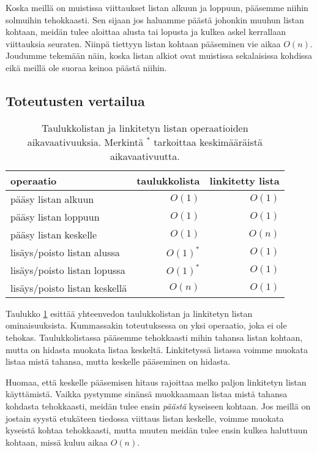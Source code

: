 Koska meillä on muistissa viittaukset listan alkuun ja loppuun,
pääsemme niihin solmuihin tehokkaasti.
Sen sijaan jos haluamme päästä johonkin muuhun listan kohtaan,
meidän tulee aloittaa alusta tai lopusta ja kulkea askel
kerrallaan viittauksia seuraten.
Niinpä tiettyyn listan kohtaan pääseminen vie aikaa $O(n)$.
Joudumme tekemään näin, koska listan alkiot ovat muistissa
sekalaisissa kohdissa eikä meillä ole suoraa keinoa päästä niihin.

\subsection{Toteutusten vertailua}

\begin{table}
\center
\begin{tabular}{lrr}
operaatio & taulukkolista & linkitetty lista \\
\hline
pääsy listan alkuun & $O(1)$ & $O(1)$ \\
pääsy listan loppuun & $O(1)$ & $O(1)$ \\ 
pääsy listan keskelle &  $O(1)$ & $O(n)$ \\
lisäys/poisto listan alussa & $O(1)^*$ & $O(1)$ \\
lisäys/poisto listan lopussa & $O(1)^*$ & $O(1)$ \\ 
lisäys/poisto listan keskellä &  $O(n)$ & $O(1)$ \\
\end{tabular}
\caption{Taulukkolistan ja linkitetyn listan operaatioiden
aikavaativuuksia. Merkintä $^*$ tarkoittaa keskimääräistä aikavaativuutta.}
\label{tab:taulin}
\end{table}

Taulukko \ref{tab:taulin} esittää yhteenvedon taulukkolistan ja
linkitetyn listan ominaisuuksista.
Kummassakin toteutuksessa on yksi operaatio,
joka ei ole tehokas.
Taulukkolistassa pääsemme tehokkaasti mihin tahansa listan
kohtaan, mutta on hidasta muokata listaa keskeltä.
Linkitetyssä listassa voimme muokata listaa mistä tahansa,
mutta keskelle pääseminen on hidasta.

Huomaa, että keskelle pääsemisen hitaus rajoittaa melko paljon
linkitetyn listan käyttämistä.
Vaikka pystymme sinänsä muokkaamaan listaa mistä tahansa kohdasta
tehokkaasti, meidän tulee ensin \emph{päästä} kyseiseen kohtaan.
Jos meillä on jostain syystä etukäteen tiedossa viittaus listan keskelle,
voimme muokata kyseistä kohtaa tehokkaasti,
mutta muuten meidän tulee ensin kulkea haluttuun kohtaan,
missä kuluu aikaa $O(n)$.

